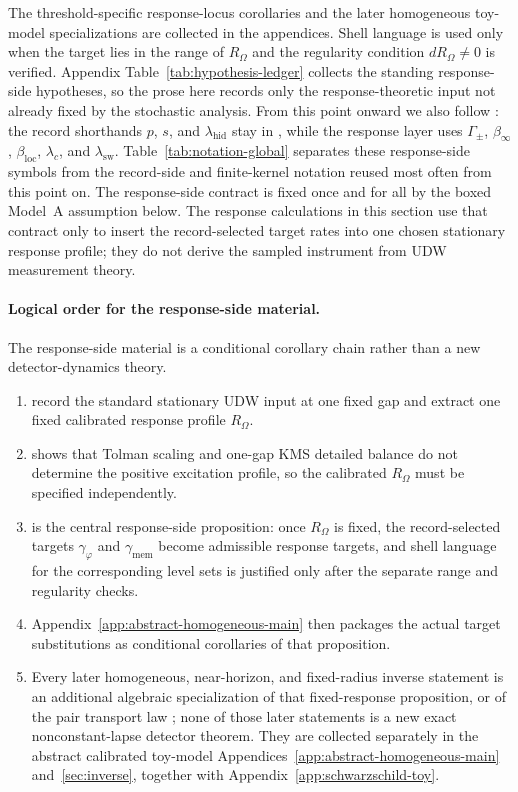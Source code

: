 The threshold-specific response-locus corollaries and the later homogeneous
toy-model specializations are collected in the appendices. Shell language is
used only when the target lies in the range of $R_\Omega$ and the regularity
condition $dR_\Omega\neq 0$ is verified. Appendix
Table~\ref{tab:hypothesis-ledger} collects the standing response-side
hypotheses, so the prose here records only the response-theoretic input not
already fixed by the stochastic analysis. From this point onward we also follow
: the record shorthands $p$, $s$, and
$\lambda_{\mathrm{hid}}$ stay in , while the response layer
uses $\Gamma_\pm$, $\beta_\infty$, $\beta_{\mathrm{loc}}$, $\lambda_c$, and
$\lambda_{\mathrm{sw}}$. Table~\ref{tab:notation-global} separates these
response-side symbols from the record-side and finite-kernel notation reused
most often from this point on.
The response-side contract is fixed once and for all by the boxed Model~A
assumption below. The response calculations in this section use that contract
only to insert the record-selected target rates into one chosen stationary
response profile; they do not derive the sampled instrument from UDW
measurement theory.

\paragraph{Logical order for the response-side material.}
The response-side material is a conditional corollary chain rather than a new
detector-dynamics theory.
\begin{enumerate}[label=\textup{(\roman*)},leftmargin=2.2em,itemsep=0.25em]
\item {}
record the standard stationary UDW input at one fixed gap and extract one fixed
calibrated response profile $R_\Omega$.
\item {} shows that Tolman scaling
and one-gap KMS detailed balance do not determine the positive excitation
profile, so the calibrated $R_\Omega$ must be specified independently.
\item {} is the central response-side proposition: once
$R_\Omega$ is fixed, the record-selected targets $\gamma_\varphi$ and
$\gamma_{\mathrm{mem}}$ become admissible response targets, and shell language
for the corresponding level sets is justified only after the separate range and
regularity checks.
\item Appendix~\ref{app:abstract-homogeneous-main} then packages the actual
target substitutions as conditional corollaries of that proposition.
\item Every later homogeneous, near-horizon, and fixed-radius inverse
statement is an additional algebraic specialization of that fixed-response
proposition, or of the pair transport law
; none of those later statements is a new
exact nonconstant-lapse detector theorem. They are collected separately in the
abstract calibrated toy-model Appendices~\ref{app:abstract-homogeneous-main}
and~\ref{sec:inverse}, together with Appendix~\ref{app:schwarzschild-toy}.
\end{enumerate}

